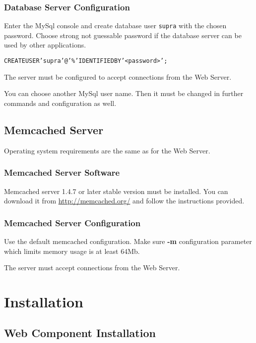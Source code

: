 \documentclass[12pt]{article}
\begin{document}
\subsubsection{Database Server Configuration}

Enter the MySql console and create database user \texttt{supra} with the chosen password. Choose strong not guessable password if the database server can be used by other applications.

\begin{alltt}
CREATE USER 'supra'@'\%' IDENTIFIED BY '<password>';
\end{alltt}

The server must be configured to accept connections from the Web Server.

You can choose another MySql user name. Then it must be changed in further commands and configuration as well.

\subsection{Memcached Server}
Operating system requirements are the same as for the Web Server.

\subsubsection{Memcached Server Software}

Memcached server 1.4.7 or later stable version must be installed. You can download it from \url{http://memcached.org/} and follow the instructions provided.

\subsubsection{Memcached Server Configuration}

Use the default memcached configuration. Make sure \textbf{-m} configuration parameter which limits memory usage is at least 64Mb.

The server must accept connections from the Web Server.

\section{Installation}

\subsection{Web Component Installation}
\end{document}
